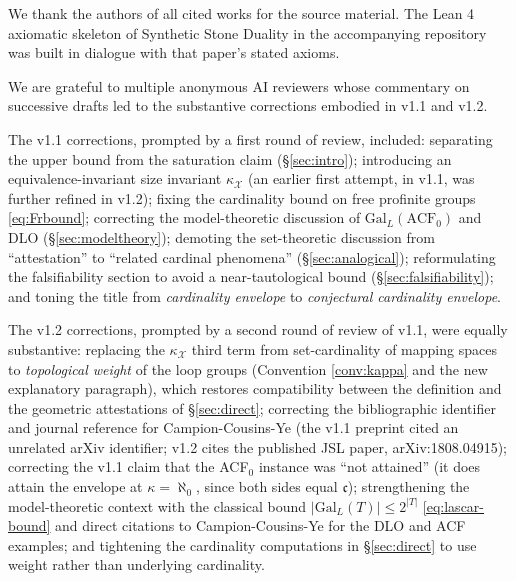 \documentclass[11pt]{article}
\theoremstyle{definition}
\theoremstyle{plain}
\theoremstyle{remark}
\newcommand{\GalL}{\mathrm{Gal}_{L}}
\newcommand{\continuum}{\mathfrak{c}}
\begin{document}
We thank the authors of all cited works for the source material. The Lean 4
axiomatic skeleton of Synthetic Stone Duality \cite{CCGM2024} in the
accompanying repository was built in dialogue with that paper's stated
axioms.

We are grateful to multiple anonymous AI reviewers whose commentary on
successive drafts led to the substantive corrections embodied in v1.1 and
v1.2.

The v1.1 corrections, prompted by a first round of review, included:
separating the upper bound from the saturation claim (\S\ref{sec:intro});
introducing an equivalence-invariant size invariant $\kappa_{\mathcal X}$
(an earlier first attempt, in v1.1, was further refined in v1.2); fixing
the cardinality bound on free profinite groups \eqref{eq:Frbound};
correcting the model-theoretic discussion of $\GalL(\mathrm{ACF}_0)$ and
DLO (\S\ref{sec:modeltheory}); demoting the set-theoretic discussion from
``attestation'' to ``related cardinal phenomena'' (\S\ref{sec:analogical});
reformulating the falsifiability section to avoid a near-tautological bound
(\S\ref{sec:falsifiability}); and toning the title from \emph{cardinality
envelope} to \emph{conjectural cardinality envelope}.

The v1.2 corrections, prompted by a second round of review of v1.1,
were equally substantive: replacing the $\kappa_{\mathcal X}$ third term
from set-cardinality of mapping spaces to \emph{topological weight} of the
loop groups (Convention \ref{conv:kappa} and the new explanatory paragraph),
which restores compatibility between the definition and the geometric
attestations of \S\ref{sec:direct}; correcting the bibliographic
identifier and journal reference for Campion-Cousins-Ye (the v1.1
preprint cited an unrelated arXiv identifier; v1.2 cites the published
JSL paper, arXiv:1808.04915); correcting the v1.1 claim that the
ACF$_0$ instance was ``not attained'' (it does attain the envelope at
$\kappa = \aleph_0$, since both sides equal $\continuum$); strengthening
the model-theoretic context with the classical bound $|\GalL(T)| \le 2^{|T|}$
\eqref{eq:lascar-bound} and direct citations to Campion-Cousins-Ye for
the DLO and ACF examples; and tightening the cardinality computations
in \S\ref{sec:direct} to use weight rather than underlying cardinality.
\end{document}
